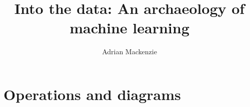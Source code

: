 \documentclass[a4paper,11pt]{book}
\title{ Into the data: An archaeology of machine learning}
\author{Adrian Mackenzie}
\begin{document}
\frontmatter
\maketitle


\tableofcontents
\listoffigures
\listoftables
\mainmatter

\cleardoublepage {} {}
\part*{Operations and diagrams}



%
%
%
%
%
%
%
\end{document}
